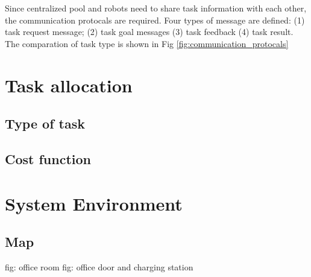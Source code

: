 Since centralized pool and robots need to share task information with each other, the communication protocals are required. Four types of message are defined: (1) task request message; (2) task goal messages (3) task feedback (4) task result. The comparation of task type is shown in Fig \ref{fig:communication_protocals}


\section{Task allocation}
\subsection{Type of task}
\subsection{Cost function}

\section{System Environment}
\subsection{Map}

fig: office room 
fig: office door and charging station 





